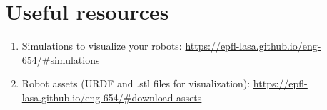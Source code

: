 \documentclass[11pt,a4paper]{article}
\begin{document}
\section*{Useful resources}
\begin{enumerate}
	\item Simulations to visualize your robots: \url{https://epfl-lasa.github.io/eng-654/#simulations} 
	\item Robot assets (URDF and .stl files for visualization): \url{https://epfl-lasa.github.io/eng-654/#download-assets}
\end{enumerate}
\end{document}
